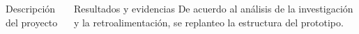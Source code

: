 \documentclass{beamer}
\begin{document}
\begin{frame}[fragile]{}
\begin{columns}[t]
\begin{column}{0.46\textwidth}
\begin{block}{Descripción del proyecto}
\begin{minipage}[t]{1\linewidth}
			\end{minipage} 
	  	\end{block}
	  \end{column}
	
	 \begin{column}{0.46\linewidth}
	 	\begin{block}{Resultados y evidencias}
	 	De acuerdo al análisis de la investigación y la  retroalimentación, se replanteo la estructura del prototipo.
	 	\begin{figure}[H]
	 		\centering

\end{figure}
\end{block}
\end{column}
\end{columns}
\end{frame}
\end{document}
